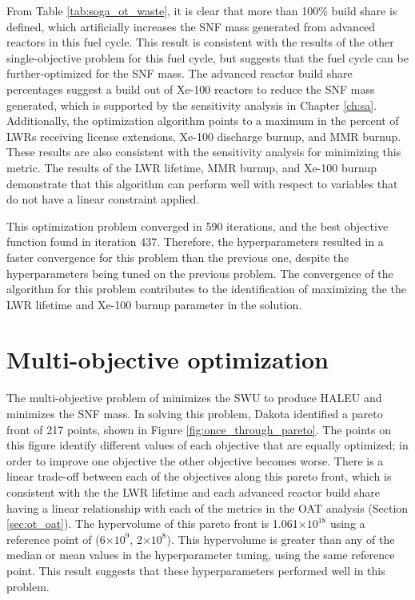 From Table \ref{tab:soga_ot_waste}, it is clear that more than 100\% build share
is defined, which artificially increases the \gls{SNF} mass generated from 
advanced reactors in this fuel cycle. This result is consistent with the results of 
the other single-objective problem for this fuel cycle, but suggests 
that the fuel cycle can be further-optimized for the \gls{SNF} mass. 
The advanced reactor build share percentages suggest 
a build out of Xe-100 reactors to reduce the \gls{SNF} mass generated, which 
is supported by the sensitivity analysis in Chapter \ref{ch:sa}. Additionally, 
the optimization algorithm points to a maximum in the percent of \glspl{LWR} 
receiving license extensions, Xe-100 discharge burnup, and \gls{MMR} burnup. 
These results are also consistent with the sensitivity analysis 
for minimizing this metric. The results of the 
\gls{LWR} lifetime, \gls{MMR} burnup, and Xe-100 burnup demonstrate that this 
algorithm can perform well with respect to variables that do not have a 
linear constraint applied. 

This optimization problem converged in 590 iterations, and the best objective 
function found in iteration 437. Therefore, the hyperparameters resulted 
in a faster convergence for this problem than the previous one, despite the 
hyperparameters being tuned on the previous problem. The convergence of 
the algorithm for this problem contributes to the identification 
of maximizing the the \gls{LWR} lifetime and Xe-100 burnup parameter 
in the solution. 

\section{Multi-objective optimization}
The multi-objective problem of minimizes the \gls{SWU} to produce 
\gls{HALEU} and minimizes the \gls{SNF} mass. In solving 
this problem, Dakota identified a pareto front 
of 217 points, shown in Figure \ref{fig:once_through_pareto}. The points 
on this figure identify different values of each objective that are equally 
optimized; in order to improve one objective the other objective becomes 
worse. There is a linear trade-off between each of the objectives along this 
pareto front, which is consistent with the the \gls{LWR} lifetime and 
each advanced reactor build share having a linear relationship with 
each of the metrics in the \gls{OAT} analysis (Section \ref{sec:ot_oat}). 
The hypervolume of this pareto front is 1.061$\times 10^{18}$ using a 
reference point of (6$\times 10^9$, 2$\times 10^8$). This hypervolume is 
greater than any of the median or mean values in the hyperparameter tuning,
using the same reference point. This result suggests that these hyperparameters 
performed well in this problem. 


